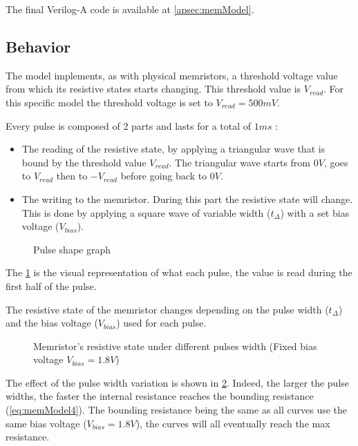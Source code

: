 The final Verilog-A code is available at \cref{apsec:memModel}.

\subsection{Behavior}\label{subsec:memModelBehave}

The model implements, as with physical memristors, a threshold voltage value from which its resistive states starts changing. This threshold value is $V_{read}$. For this specific model the threshold voltage is set to $V_{read}=500mV$.

Every pulse is composed of 2 parts and lasts for a total of $1 ms$ :
\begin{itemize}
  \item The reading of the resistive state, by applying a triangular wave that is bound by the threshold value $V_{read}$. The triangular wave starts from $0V$, goes to $V_{read}$ then to $-V_{read}$ before going back to $0V$.
  \item The writing to the memristor. During this part the resistive state will change. This is done by applying a square wave of variable width ($t_{\Delta}$) with a set bias voltage ($V_{bias}$).
\end{itemize}

\begin{figure}[H]
  \centering
  
  \caption{Pulse shape graph}
  \label{graph:memInput}
\end{figure}

The \cref{graph:memInput} is the visual representation of what each pulse, the value is read during the first half of the pulse.

The resistive state of the memristor changes depending on the pulse width ($t_{\Delta}$) and the bias voltage ($V_{bias}$) used for each pulse.

\begin{figure}[H]
  \centering
  
  \caption{Memristor's resistive state under different pulses width (Fixed bias voltage $V_{bias}=1.8V$)}
  \label{graph:pulseChange}
\end{figure}

The effect of the pulse width variation is shown in \cref{graph:pulseChange}. Indeed, the larger the pulse widths, the faster the internal resistance reaches the bounding resistance (\cref{eq:memModel4}). The bounding resistance being the same as all curves use the same bias voltage ($V_{bias}=1.8V$), the curves will all eventually reach the max resistance.

